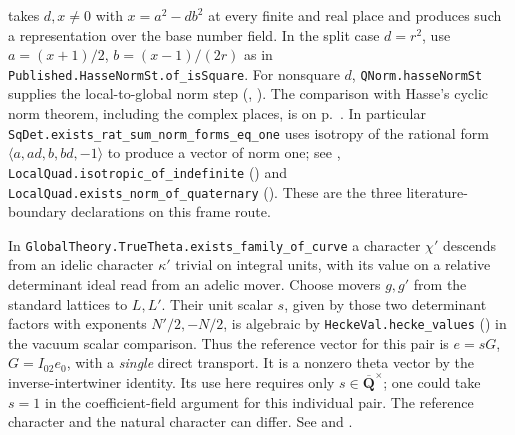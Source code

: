 takes $d,x\ne0$ with $x=a^2-db^2$ at every finite and real place and
produces such a representation over the base number field. In the split
case $d=r^2$, use $a=(x+1)/2$, $b=(x-1)/(2r)$ as in
\nolinkurl{Published.HasseNormSt.of_isSquare}. For nonsquare $d$,
\nolinkurl{QNorm.hasseNormSt} supplies the local-to-global norm step
(,
).
The comparison with Hasse's cyclic norm theorem, including the
complex places, is on p.~\pageref{r15:hasse-comparison}.
In particular \nolinkurl{SqDet.exists_rat_sum_norm_forms_eq_one}
uses isotropy of the rational form $\langle a,ad,b,bd,-1\rangle$
to produce a vector of norm one; see
,
\nolinkurl{LocalQuad.isotropic_of_indefinite}
() and
\nolinkurl{LocalQuad.exists_norm_of_quaternary}
().
These are the three literature-boundary declarations on this frame route.

In \nolinkurl{GlobalTheory.TrueTheta.exists_family_of_curve} a character
\(\chi'\) descends from an idelic character \(\kappa'\) trivial on
integral units, with its value on a relative determinant ideal read
from an adelic mover. Choose movers \(g,g'\) from the standard
lattices to \(L,L'\). Their unit scalar \(s\), given by those two
determinant factors with exponents \(N'/2,-N/2\), is algebraic by
\nolinkurl{HeckeVal.hecke_values}
() in the vacuum scalar
comparison. Thus the reference vector for this pair is
\(e=sG\), \(G=I_{02}e_0\), with a \emph{single} direct transport.
It is a nonzero theta vector by the inverse-intertwiner identity.
Its use here requires only \(s\in\overline{\mathbf Q}^{\times}\);
one could take \(s=1\) in the coefficient-field argument for this
individual pair. The reference character and the natural character
can differ. See 
and .

